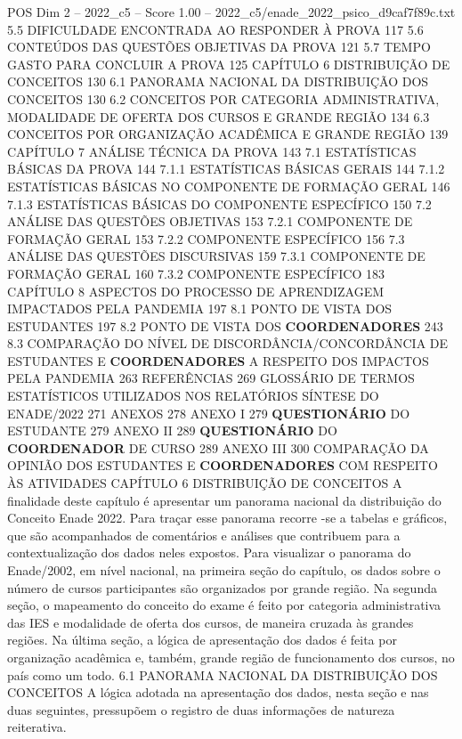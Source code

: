 \begin{textsample}{POS Dim 2 – 2022\_c5 – Score 1.00 – 2022\_c5/enade\_2022\_psico\_d9caf7f89c.txt}  \label{ex:f2_pos_217}
5.5 DIFICULDADE ENCONTRADA AO RESPONDER À PROVA 117 5.6 CONTEÚDOS DAS QUESTÕES OBJETIVAS DA PROVA 121 5.7 TEMPO GASTO PARA CONCLUIR A PROVA 125 CAPÍTULO 6 DISTRIBUIÇÃO DE CONCEITOS 130 6.1 PANORAMA NACIONAL DA DISTRIBUIÇÃO DOS CONCEITOS 130 6.2 CONCEITOS POR CATEGORIA ADMINISTRATIVA, MODALIDADE DE OFERTA DOS CURSOS E GRANDE REGIÃO 134 6.3 CONCEITOS POR ORGANIZAÇÃO ACADÊMICA E GRANDE REGIÃO 139 CAPÍTULO 7 ANÁLISE TÉCNICA DA PROVA 143 7.1 ESTATÍSTICAS BÁSICAS DA PROVA 144 7.1.1 ESTATÍSTICAS BÁSICAS GERAIS 144 7.1.2 ESTATÍSTICAS BÁSICAS NO COMPONENTE DE FORMAÇÃO GERAL 146 7.1.3 ESTATÍSTICAS BÁSICAS DO COMPONENTE ESPECÍFICO 150 7.2 ANÁLISE DAS QUESTÕES OBJETIVAS 153 7.2.1 COMPONENTE DE FORMAÇÃO GERAL 153 7.2.2 COMPONENTE ESPECÍFICO 156 7.3 ANÁLISE DAS QUESTÕES DISCURSIVAS 159 7.3.1 COMPONENTE DE FORMAÇÃO GERAL 160 7.3.2 COMPONENTE ESPECÍFICO 183 CAPÍTULO 8 ASPECTOS DO PROCESSO DE APRENDIZAGEM IMPACTADOS PELA PANDEMIA 197 8.1 PONTO DE VISTA DOS ESTUDANTES 197 8.2 PONTO DE VISTA DOS \textbf{COORDENADORES} 243 8.3 COMPARAÇÃO DO NÍVEL DE DISCORDÂNCIA/CONCORDÂNCIA DE ESTUDANTES E \textbf{COORDENADORES} A RESPEITO DOS IMPACTOS PELA PANDEMIA 263 REFERÊNCIAS 269 GLOSSÁRIO DE TERMOS ESTATÍSTICOS UTILIZADOS NOS RELATÓRIOS SÍNTESE DO ENADE/2022 271 ANEXOS 278 ANEXO I 279 \textbf{QUESTIONÁRIO} DO ESTUDANTE 279 ANEXO II 289 \textbf{QUESTIONÁRIO} DO \textbf{COORDENADOR} DE CURSO 289 ANEXO III 300 COMPARAÇÃO DA OPINIÃO DOS ESTUDANTES E \textbf{COORDENADORES} COM RESPEITO ÀS ATIVIDADES CAPÍTULO 6 DISTRIBUIÇÃO DE CONCEITOS A finalidade deste capítulo é apresentar um panorama nacional da distribuição do Conceito Enade 2022.
Para traçar esse panorama recorre -se a tabelas e gráficos, que são acompanhados de comentários e análises que contribuem para a contextualização dos dados neles expostos.
Para visualizar o panorama do Enade/2002, em nível nacional, na primeira seção do capítulo, os dados sobre o número de cursos participantes são organizados por grande região.
Na segunda seção, o mapeamento do conceito do exame é feito por categoria administrativa das IES e modalidade de oferta dos cursos, de maneira cruzada às grandes regiões.
Na última seção, a lógica de apresentação dos dados é feita por organização acadêmica e, também, grande região de funcionamento dos cursos, no país como um todo. 6.1 PANORAMA NACIONAL DA DISTRIBUIÇÃO DOS CONCEITOS A lógica adotada na apresentação dos dados, nesta seção e nas duas seguintes, pressupõem o registro de duas informações de natureza reiterativa.

\end{textsample}
